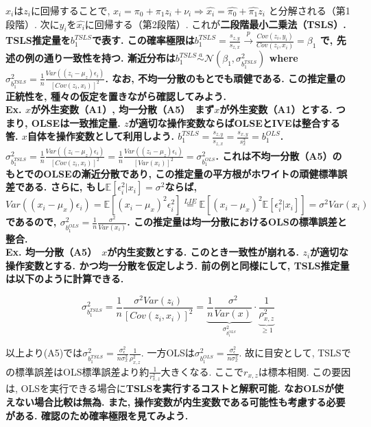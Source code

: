 \documentclass[paper=a4paper,fontsize=10pt]{jlreq}
\begin{document}
$x_i$は$z_i$に回帰することで, $x_i = \pi_0 + \pi_1 z_i + \nu_i ⇒ \hat{x_i} = \hat{\pi_0} + \hat{\pi_1} z_i$ と分解される（第1段階）. 次に$y_i$を$\hat{x_i}$に回帰する（第2段階）. これが\rmfamily\mcfamily\bfseries{二段階最小二乗法（TSLS）}\mdseries . TSLS推定量を$b_1^{TSLS}$で表す. この確率極限は$b_1^{TSLS} = \frac{s_{z,y}}{s_{z,x}} \overset{p}{\to} \frac{Cov(z_i, y_i)}{Cov(z_i, x_i)} = \beta_1$ で, 先述の例の通り一致性を持つ. 漸近分布は$b_1^{TSLS} \overset{a}{\sim} \mathcal{N}({\beta_1}, \sigma_{b_1^{TSLS}}^2)$ where $\sigma_{b_1^{TSLS}}^2 = \frac{1}{n}\frac{Var((z_i - \mu_z)\epsilon_i)}{[Cov(z_i, x_i)]^2}$. なお, 不均一分散のもとでも頑健である. この推定量の正統性を, 種々の仮定を置きながら確認してみよう.\\

\rmfamily\mcfamily\bfseries{Ex. $x$が外生変数（A1）, 均一分散（A5）}\mdseries　まず$x$が外生変数（A1）とする. つまり, OLSEは一致推定量. $z$が適切な操作変数ならばOLSEとIVEは整合する筈. $x$自体を操作変数として利用しよう. $b_1^{TSLS} = \frac{s_{z,y}}{s_{z,x}} = \frac{s_{x,y}}{s^{2}_{x}} = b_1^{OLS}$. $\sigma_{b_1^{TSLS}}^2 = \frac{1}{n}\frac{Var((z_i - \mu_z)\epsilon_i)}{[Cov(z_i, x_i)]^2} = \frac{1}{n}\frac{Var((z_i - \mu_z)\epsilon_i)}{[Var(x_i)]^2} = \sigma_{b_1^{OLS}}^2$. これは不均一分散（A5）のもとでのOLSEの漸近分散であり, この推定量の平方根がホワイトの頑健標準誤差である. さらに, もし$\mathbb{E}[\epsilon_i^2 | x_i] = \sigma^2$ならば, $Var((x_i - \mu_x)\epsilon_i) = \mathbb{E}[(x_i - \mu_x)^2\epsilon_i^2] \overset{LIE}{=} \mathbb{E}[(x_i - \mu_x)^2\mathbb{E}[\epsilon_i^2 | x_i]] = \sigma^2 Var(x_i)$であるので, $\sigma_{b_1^{OLS}}^2 = \frac{1}{n}\frac{\sigma^2}{Var(x_i)}$. この推定量は均一分散におけるOLSの標準誤差と整合.\\

\rmfamily\mcfamily\bfseries{Ex. 均一分散（A5）}\mdseries　$x$が内生変数とする. このとき一致性が崩れる. $z_i$が適切な操作変数とする. かつ均一分散を仮定しよう. 前の例と同様にして, TSLS推定量は以下のように計算できる.

\begin{equation*}
  \sigma_{b_1^{TSLS}}^2 = \frac{1}{n}\frac{\sigma^2Var(z_i)}{[Cov(z_i, x_i)]^2} = \underset{\sigma_{b_1^{OLS}}^2}{\underbrace{\frac{1}{n}\frac{\sigma^2}{Var(x)}}} \cdot \underset{\geq 1}{\underbrace{\frac{1}{\rho_{x, z}^2}}}
\end{equation*}

以上より(A5)では$\sigma_{b_1^{TSLS}}^2 = \frac{\sigma_{\epsilon}^2}{n \sigma_{x}^2}\frac{1}{\rho_{x, z}^2}$. 一方OLSは$\sigma_{b_1^{OLS}}^2 = \frac{\sigma_{\epsilon}^2}{n \sigma_{x}^2}$. 故に目安として, TSLSでの標準誤差はOLS標準誤差より約$\frac{1}{r_{x, z}^2}$大きくなる. ここで$r_{x,z}$は標本相関. この要因は, OLSを実行できる場合に\rmfamily\mcfamily\bfseries{TSLSを実行するコスト}\mdseries と解釈可能. なおOLSが使えない場合比較は無為. また, 操作変数が内生変数である可能性も考慮する必要がある. 確認のため確率極限を見てみよう.
\end{document}
